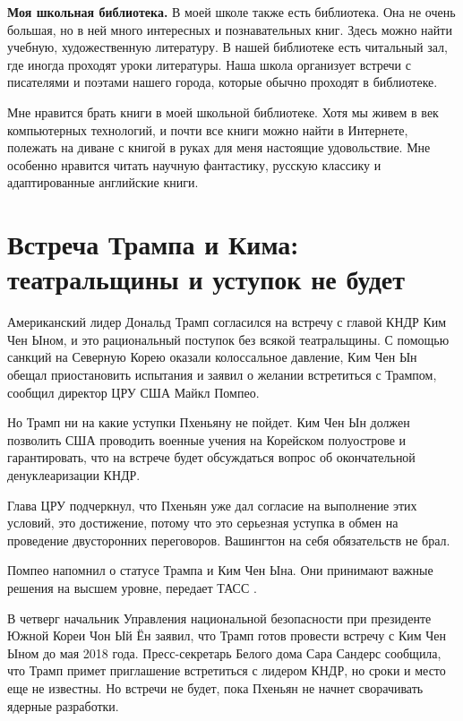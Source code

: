 \textbf{Моя школьная библиотека.}
В моей школе также есть библиотека. Она не очень большая, но в ней много интересных и познавательных книг. Здесь можно найти  учебную,  художественную литературу.
В нашей библиотеке есть  читальный зал, где иногда проходят уроки литературы. Наша школа организует встречи с писателями и поэтами нашего города, которые обычно проходят в библиотеке.

Мне нравится брать книги в моей школьной библиотеке. Хотя мы живем в век компьютерных технологий, и почти все книги можно найти в Интернете, полежать на диване с книгой в руках для меня настоящие удовольствие.
Мне особенно нравится читать научную фантастику, русскую классику и адаптированные английские книги.

\section{Встреча Трампа и Кима: театральщины и уступок не будет}

Американский лидер Дональд Трамп согласился на встречу с главой КНДР Ким Чен Ыном, и это рациональный поступок без всякой театральщины. С помощью санкций на Северную Корею оказали колоссальное давление, Ким Чен Ын обещал приостановить испытания и заявил о желании встретиться с Трампом, сообщил директор ЦРУ США Майкл Помпео.

Но Трамп ни на какие уступки Пхеньяну не пойдет. Ким Чен Ын должен позволить США проводить военные учения на Корейском полуострове и гарантировать, что на встрече будет обсуждаться вопрос об окончательной денуклеаризации КНДР.

Глава ЦРУ подчеркнул, что Пхеньян уже дал согласие на выполнение этих условий, это достижение, потому что это серьезная уступка в обмен на проведение двусторонних переговоров. Вашингтон на себя обязательств не брал.

Помпео напомнил о статусе Трампа и Ким Чен Ына. Они принимают важные решения на высшем уровне, передает ТАСС .

В четверг начальник Управления национальной безопасности при президенте Южной Кореи Чон Ый Ён заявил, что Трамп готов провести встречу с Ким Чен Ыном до мая 2018 года. Пресс-секретарь Белого дома Сара Сандерс сообщила, что Трамп примет приглашение встретиться с лидером КНДР, но сроки и место еще не известны. Но встречи не будет, пока Пхеньян не начнет сворачивать ядерные разработки.

